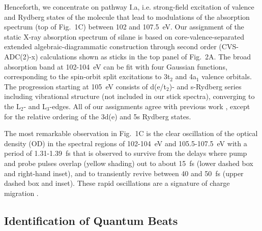 \documentclass[12pt]{article}
\begin{document}
Henceforth, we concentrate on pathway I.a, i.e. strong-field excitation of valence and Rydberg states of the molecule
that lead to modulations of the absorption spectrum (top of Fig.~1C) between 102 and 107.5~eV. %
Our assignment of the static X-ray absorption spectrum of silane is based on core-valence-separated extended algebraic-diagrammatic construction through second order (CVS-ADC(2)-x) calculations shown as sticks in the top panel of Fig.~2A. The broad absorption band at 102-104~eV can be fit with four Gaussian functions, corresponding to the spin-orbit split excitations to 3t$_2$ and 4a$_1$ valence orbitals. The progression starting at 105~eV consists of d(e/t$_2$)- and s-Rydberg series including vibrational structure (not included in our stick spectra), converging to the L$_2$- and L$_3$-edges. All of our assignments agree with previous work \cite{puettner97a}, except for the relative ordering of the 3d(e) and 5s Rydberg states.

The most remarkable observation in Fig.~1C is the clear oscillation of the optical density (OD) in the spectral regions of 102-104~eV and 105.5-107.5~eV with a period of 1.31-1.39~fs that is observed to survive from the delays where pump and probe pulses overlap (yellow shading) out to about 15~fs (lower dashed box and right-hand inset), and to transiently revive between 40 and 50~fs (upper dashed box and inset). These rapid oscillations are a signature of charge migration \cite{golubev2020ATAS}.

\subsection{Identification of Quantum Beats}
\end{document}
